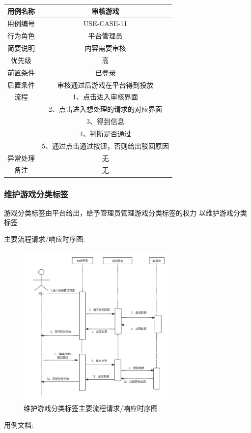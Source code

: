 \documentclass[12pt]{ctexart} %
\begin{document}
\begin{tabular}{|c|c|}
  \hline
  用例名称& 审核游戏\\
  \hline
  用例编号 & USE-CASE-11\\
  \hline
  行为角色 & 平台管理员\\
  \hline
  简要说明 & 内容需要审核\\
  \hline
  优先级 & 高\\
  \hline
  前置条件 & 已登录\\
  \hline
  后置条件 & 审核通过后游戏在平台得到投放\\
  \hline
  流程 & 1、点击进入审核界面\\
      &  2、点击进入想处理的请求的对应界面\\
      &  3、得到信息\\
      &  4、判断是否通过\\
      &  5、通过点击通过按钮，否则给出驳回原因\\
  \hline
  异常处理 & 无\\
  \hline
  备注 & 无\\
\end{tabular}

\subsubsection{维护游戏分类标签}
游戏分类标签由平台给出，给予管理员管理游戏分类标签的权力
以维护游戏分类标签

主要流程请求/响应时序图:
\begin{figure}[ht]
  \centering
  \includegraphics[width=0.7\textwidth]{yongli12.jpg}
  \caption{维护游戏分类标签主要流程请求/响应时序图}
\end{figure}
用例文档:
\end{document}
